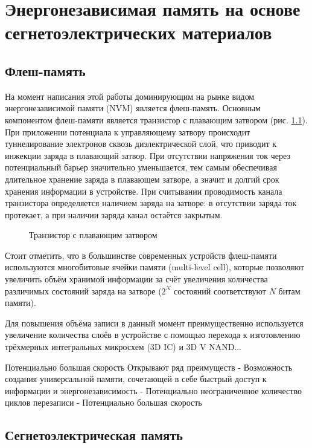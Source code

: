 \chapter{Энергонезависимая память на основе сегнетоэлектрических материалов}\label{ch:ch0}
\section{Флеш-память}\label{sec:ch0/sec1}
На момент написания этой работы доминирующим на рынке видом энергонезависимой памяти (NVM) является флеш-память. Основным компонентом флеш-памяти является транзистор с плавающим затвором (рис. \cref{fig:floating_gate_transistor}). При приложении потенциала к управляющему затвору происходит туннелирование электронов сквозь диэлектрической слой, что приводит к инжекции заряда в плавающий затвор. При отсутствии напряжения ток через потенциальный барьер значительно уменьшается, тем самым обеспечивая длительное хранение заряда в плавающем затворе, а значит и долгий срок хранения информации в устройстве. При считывании проводимость канала транзистора определяется наличием заряда на затворе: в отсутствии заряда ток протекает, а при наличии заряда канал остаётся закрытым.

\begin{figure}[ht]
    \caption{Транзистор с плавающим затвором}\label{fig:floating_gate_transistor}
\end{figure}

Стоит отметить, что в большинстве современных устройств флеш-памяти используются многобитовые ячейки памяти (multi-level cell), которые позволяют увеличить объём хранимой информации за счёт увеличения количества различимых состояний заряда на затворе (\(2^N\) состояний соответствуют \(N\) битам памяти).

Для повышения объёма записи в данный момент преимущественно используется увеличение количества слоёв в устройстве с помощью перехода к изготовлению трёхмерных интегральных микросхем (3D IC) и 3D V NAND...

Потенциально большая скорость
Открывают ряд преимуществ
- Возможность создания универсальной памяти, сочетающей в себе быстрый доступ к информации и энергонезависимость
- Потенциально неограниченное количество циклов перезаписи
- Потенциально большая скорость

\section{Сегнетоэлектрическая память}\label{sec:ch0/sec2}
